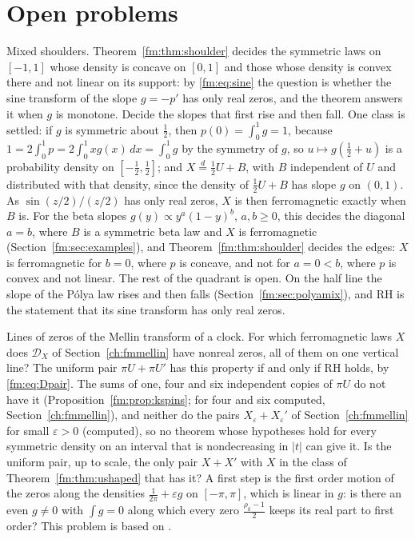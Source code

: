 \section{Open problems}\label{ch:fmopen}

\begin{problem}\label{fm:prob:shoulder}
Mixed shoulders. Theorem~\ref{fm:thm:shoulder} decides the symmetric laws on $[-1,1]$ whose density is concave on $[0,1]$ and those whose density is convex there and not linear on its support: by \eqref{fm:eq:sine} the question is whether the sine transform of the slope $g=-p'$ has only real zeros, and the theorem answers it when $g$ is monotone. Decide the slopes that first rise and then fall. One class is settled: if $g$ is symmetric about $\frac12$, then $p(0)=\int_0^1g=1$, because $1=2\int_0^1p=2\int_0^1xg(x)\,dx=\int_0^1g$ by the symmetry of $g$, so $u\mapsto g(\frac12+u)$ is a probability density on $[-\frac12,\frac12]$; and $X\overset d=\frac12U+B$, with $B$ independent of $U$ and distributed with that density, since the density of $\frac12U+B$ has slope $g$ on $(0,1)$. As $\sin(z/2)/(z/2)$ has only real zeros, $X$ is then ferromagnetic exactly when $B$ is. For the beta slopes $g(y)\propto y^a(1-y)^b$, $a,b\ge0$, this decides the diagonal $a=b$, where $B$ is a symmetric beta law and $X$ is ferromagnetic (Section~\ref{fm:sec:examples}), and Theorem~\ref{fm:thm:shoulder} decides the edges: $X$ is ferromagnetic for $b=0$, where $p$ is concave, and not for $a=0<b$, where $p$ is convex and not linear. The rest of the quadrant is open. On the half line the slope of the P\'olya law rises and then falls (Section~\ref{fm:sec:polyamix}), and RH is the statement that its sine transform has only real zeros.
\end{problem}

\begin{problem}\label{fm:prob:mellin}
Lines of zeros of the Mellin transform of a clock. For which ferromagnetic laws $X$ does $\mathcal D_X$ of Section~\ref{ch:fmmellin} have nonreal zeros, all of them on one vertical line? The uniform pair $\pi U+\pi U'$ has this property if and only if RH holds, by \eqref{fm:eq:Dpair}. The sums of one, four and six independent copies of $\pi U$ do not have it (Proposition~\ref{fm:prop:kspins}; for four and six computed, Section~\ref{ch:fmmellin}), and neither do the pairs $X_\varepsilon+X_\varepsilon'$ of Section~\ref{ch:fmmellin} for small $\varepsilon>0$ (computed), so no theorem whose hypotheses hold for every symmetric density on an interval that is nondecreasing in $|t|$ can give it. Is the uniform pair, up to scale, the only pair $X+X'$ with $X$ in the class of Theorem~\ref{fm:thm:ushaped} that has it? A first step is the first order motion of the zeros along the densities $\frac1{2\pi}+\varepsilon g$ on $[-\pi,\pi]$, which is linear in $g$: is there an even $g\ne0$ with $\int g=0$ along which every zero $\frac{\rho_k-1}2$ keeps its real part to first order? This problem is based on \cite{P26tus,P26lyzeta}.
\end{problem}

